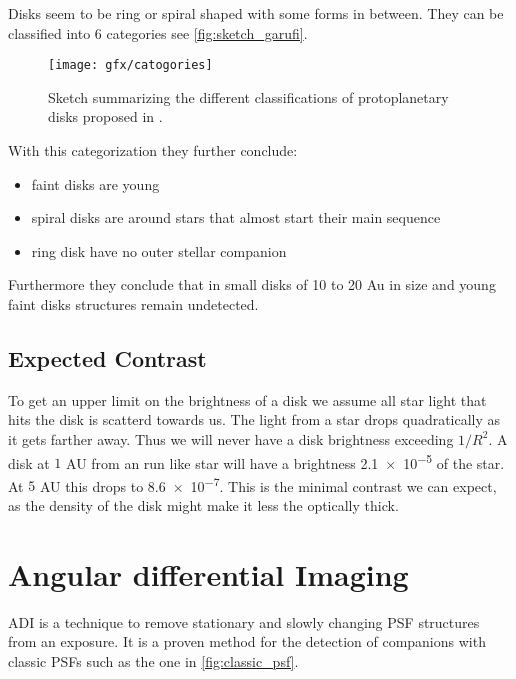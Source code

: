 Disks seem to be ring or spiral shaped with some forms in between. They can be classified into 6 categories \cite{garufi} see \autoref{fig:sketch_garufi}. 

\begin{figure}[H]
    \caption{Sketch summarizing the different classifications of protoplanetary disks proposed in \cite{garufi}.}
    \centering
    \texttt{[image: gfx/catogories]}
    \label{fig:sketch_garufi}
\end{figure}

With this categorization they \cite{garufi} further conclude:
\begin{itemize}
    \item faint disks are young
    \item spiral disks are around stars that almost start their main sequence
    \item ring disk have no outer stellar companion %
\end{itemize}

Furthermore they \cite{garufi} conclude that in small disks of 10 to 20 Au in size and young faint disks structures remain undetected.

\subsection{Expected Contrast}

To get an upper limit on the brightness of a disk we assume all star light that hits the disk is scatterd towards us. The light from a star drops quadratically as it gets farther away. Thus we will never have a disk brightness exceeding $1/R^2$. A disk at $1$ AU from an run like star will have a brightness \num{2.1e-5} of the star. At $5$ AU this drops to \num{8.6e-7}. This is the minimal contrast we can expect, as the density of the disk might make it less the optically thick.


\section{Angular differential Imaging}
\label{sec:adi}
\ac{ADI} is a technique to remove stationary and slowly changing PSF structures from an exposure. It is a proven method for the detection of companions with classic \acp{PSF} such as the one in \autoref{fig:classic_psf}. %


